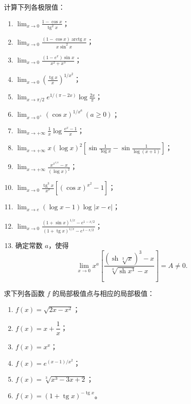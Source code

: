 \begin{exercise}
	\item 计算下列各极限值：
	\begin{enumerate}[label=\arabic*)]
		\item $\displaystyle\lim_{x\to0}\frac{1-\cos x}{\operatorname{tg}^2x}$；
		\item $\displaystyle\lim_{x\to0}\frac{(1-\cos x)\operatorname{arctg}x}{x\sin^2x}$；
		\item $\displaystyle\lim_{x\to0}\frac{(1-e^x)\sin x}{x^2+x^3}$；
		\item $\displaystyle\lim_{x\to0}\left(\frac{\operatorname{tg}x}{x}\right)^{1/x^2}$；
		\item $\displaystyle\lim_{x\to\pi/2}e^{1/(\pi-2x)}\log\frac{2x}{\pi}$；
		\item $\displaystyle\lim_{x\to0^+}(\cos x)^{1/x^a}\ (a\geqslant0)$；
		\item $\displaystyle\lim_{x\to+\infty}\frac1x\log\frac{e^x-1}{x}$；
		\item $\displaystyle\lim_{x\to+\infty}x(\log x)^2\left[\sin\frac1{\log x}-\sin\frac1{\log(x+1)}\right]$；
		\item $\displaystyle\lim_{x\to+\infty}\frac{x^{x^{1/x}}-x}{(\log x)^2}$；
		\item $\displaystyle\lim_{x\to0}\frac{\operatorname{tg}^3x}{x^7}\left[(\cos x)^{x^2}-1\right]$；
		\item $\displaystyle\lim_{x\to e}(\log x-1)\log|x-e|$；
		\item $\displaystyle\lim_{x\to0}\frac{(1+\sin x)^{1/x}-e^{1-x/2}}{(1+\operatorname{tg}x)^{1/x}-e^{1-x/2}}$；
		\item 确定常数 $a$，使得
		\[\lim_{x\to0}x^a\left[\frac{(\operatorname{sh}\sqrt[3]{x})^3-x}{\sqrt[3]{\operatorname{sh}x^3}-x}\right]=A\neq0.\]
	\end{enumerate}
\end{exercise}

\begin{exercise}
	\item 求下列各函数 $f$ 的局部极值点与相应的局部极值：
	\begin{enumerate}[label=\arabic*)]
		\item $f(x)=\sqrt{2x-x^2}$；
		\item $f(x)=x+\dfrac1x$；
		\item $f(x)=x^x$；
		\item $f(x)=e^{(x-1)/x^2}$；
		\item $f(x)=\sqrt[3]{x^3-3x+2}$；
		\item $f(x)=(1+\operatorname{tg}x)^{-\operatorname{tg}x}$。
	\end{enumerate}
\end{exercise}

